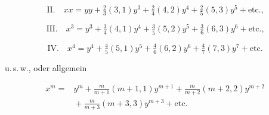 \[\text{II.}\quad xx = yy+\tfrac23(3,1)y^3+\tfrac24(4,2)y^4+\tfrac25(5,3)y^5+\text{etc.,}\]

\[\text{III.}\quad x^3 = y^3+\tfrac34(4,1)y^4+\tfrac35(5,2)y^5+\tfrac36(6,3)y^6+\text{etc.,}\]

\[\text{IV.}\quad x^4 = y^4+\tfrac45(5,1)y^5+\tfrac46(6,2)y^6+\tfrac47(7,3)y^7+\text{etc.}\]

\noindent u.\,s.\,w., oder allgemein

\[
\begin{aligned}x^m ={}&y^m + \frac{m}{m+1}(m+1,1)y^{m+1}+\frac{m}{m+2}(m+2,2)y^{m+2}\\ &{}+\frac{m}{m+3}(m+3,3)y^{m+3}+\text{etc.}
\end{aligned}
\]

